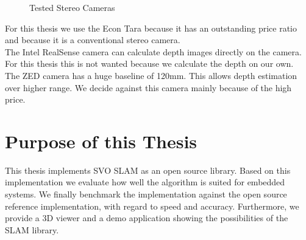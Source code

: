 \documentclass[11pt,a4paper,titlepage,oneside]{report}
\begin{document}
\begin{figure}[H]
  \centering
  \caption{Tested Stereo Cameras}\label{fig:cameras}
\end{figure}


For this thesis we use the Econ Tara because it has an outstanding price ratio and because it is a conventional stereo camera.\\
The Intel RealSense camera can calculate depth images directly on the camera. For this thesis this is not wanted because we calculate the depth on our own.\\
The ZED camera has a huge baseline of 120mm. This allows depth estimation over higher range. We decide against this camera mainly because of the high price.

\section{Purpose of this Thesis}

This thesis implements SVO SLAM as an open source library. Based on this implementation we evaluate how well the algorithm is suited for embedded systems. We finally benchmark the implementation against the open source reference implementation, with regard to speed and accuracy. Furthermore, we provide a 3D viewer and a demo application showing the possibilities of the SLAM library.
\end{document}
